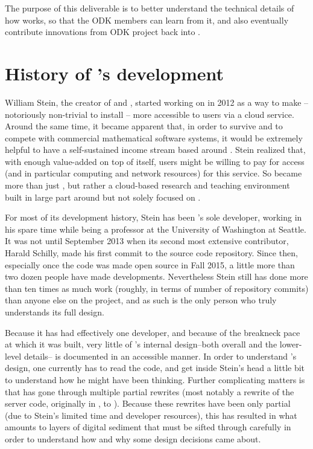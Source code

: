 \documentclass{deliverablereport}
\renewcommand{\SMC}{\software{SMC}}
\begin{document}
The purpose of this deliverable is to better understand the technical details
of how \SMC works, so that the ODK members can learn from it, and also
eventually contribute innovations from ODK project back into \SMC.

\section{History of \SMC's development}

William Stein, the creator of \Sage and \SMC, started working on \SMC in 2012
as a way to make \Sage -- notoriously non-trivial to install -- more accessible
to users via a cloud service.  Around the same time, it became apparent that,
in order to survive and to compete with commercial mathematical software
systems, it would be extremely helpful to have a self-sustained income stream
based around \Sage.  Stein realized that, with enough value-added on top of
\Sage itself, users might be willing to pay for access (and in particular
computing and network resources) for this service.  So \SMC became more than
just \Sage, but rather a cloud-based research and teaching environment built in
large part around but not solely focused on \Sage.

For most of its development history, Stein has been \SMC's sole developer,
working in his spare time while being a professor at the University of
Washington at Seattle.  It was not until September 2013 when its second most
extensive contributor, Harald Schilly, made his first commit to the \SMC source
code repository.  Since then, especially once the code was made open source in
Fall 2015, a little more than two dozen people have made developments.
Nevertheless Stein still has done more than ten times as much work (roughly, in
terms of number of repository commits) than anyone else on the project, and as
such is the only person who truly understands its full design.

Because it has had effectively one developer, and because of the breakneck pace
at which it was built, very little of \SMC's internal design--both overall and
the lower-level details-- is documented in an accessible manner.  In order to
understand \SMC's design, one currently has to read the code, and get inside
Stein's head a little bit to understand how he might have been thinking.
Further complicating matters is that \SMC has gone through multiple partial
rewrites (most notably a rewrite of the server code, originally in \Python, to
\JavaScript).  Because these rewrites have been only partial (due to Stein's
limited time and developer resources), this has resulted in what amounts to
layers of digital sediment that must be sifted through carefully in order to
understand how and why some design decisions came about.
\end{document}
